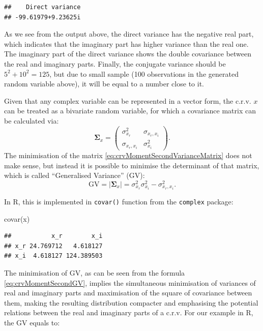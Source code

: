 \documentclass[
]{book}
\newenvironment{Shaded}{\begin{snugshade}}{\end{snugshade}}
\newcommand{\FunctionTok}[1]{\textcolor[rgb]{0.00,0.00,0.00}{#1}}
\newcommand{\NormalTok}[1]{#1}
\begin{document}
\begin{verbatim}
##    Direct variance 
## -99.61979+9.23625i
\end{verbatim}

As we see from the output above, the direct variance has the negative real part, which indicates that the imaginary part has higher variance than the real one. The imaginary part of the direct variance shows the double covariance between the real and imaginary parts. Finally, the conjugate variance should be \(5^2 + 10^2 = 125\), but due to small sample (100 observations in the generated random variable above), it will be equal to a number close to it.

Given that any complex variable can be represented in a vector form, the c.r.v. \(x\) can be treated as a bivariate random variable, for which a covariance matrix can be calculated via:
\begin{equation}
    \boldsymbol{\Sigma}_x = \begin{pmatrix} \sigma_{x_r}^2 & \sigma_{x_r, x_i} \\ \sigma_{x_r, x_i} & \sigma_{x_i}^2 \end{pmatrix} .
    \label{eq:crvMomentSecondVarianceMatrix}
\end{equation}
The minimisation of the matrix \eqref{eq:crvMomentSecondVarianceMatrix} does not make sense, but instead it is possible to minimise the determinant of that matrix, which is called ``Generalised Variance'' (GV):
\begin{equation}
    \mathrm{GV} = |\boldsymbol{\Sigma}_x| = \sigma_{x_r}^2 \sigma_{x_i}^2 - \sigma_{x_r, x_i}^2 .
    \label{eq:crvMomentSecondGV}
\end{equation}

In R, this is implemented in \texttt{covar()} function from the \texttt{complex} package:

\begin{Shaded}
\begin{Highlighting}[]
\FunctionTok{covar}\NormalTok{(x)}
\end{Highlighting}
\end{Shaded}

\begin{verbatim}
##           x_r        x_i
## x_r 24.769712   4.618127
## x_i  4.618127 124.389503
\end{verbatim}

The minimisation of GV, as can be seen from the formula \eqref{eq:crvMomentSecondGV}, implies the simultaneous minimisation of variances of real and imaginary parts and maximisation of the square of covariance between them, making the resulting distribution compacter and emphasising the potential relations between the real and imaginary parts of a c.r.v. For our example in R, the GV equals to:
\end{document}
